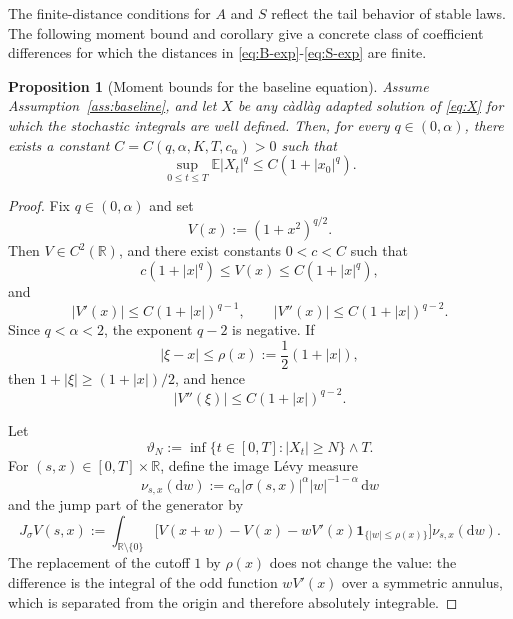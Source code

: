 \documentclass[11pt]{article}
\newtheorem{proposition}[theorem]{Proposition}
\newcommand{\R}{\mathbb{R}}
\newcommand{\E}{\mathbb{E}}
\newcommand{\1}{\mathbf{1}}
\newcommand{\md}{\mathrm{d}}
\begin{document}
The finite-distance conditions for $A$ and $S$ reflect the tail behavior of stable laws. The following moment bound and corollary give a concrete class of coefficient differences for which the distances in \eqref{eq:B-exp}-\eqref{eq:S-exp} are finite.

\begin{proposition}[Moment bounds for the baseline equation]\label{prop:baseline-moments}
Assume Assumption~\ref{ass:baseline}, and let $X$ be any c\`adl\`ag adapted solution of \eqref{eq:X} for which the stochastic integrals are well defined. Then, for every $q\in(0,\alpha)$, there exists a constant $C=C(q,\alpha,K,T,c_\alpha)>0$ such that
\[
  \sup_{0\le t\le T}\E |X_t|^q\le C(1+|x_0|^q).
\]
\end{proposition}

\begin{proof}
Fix $q\in(0,\alpha)$ and set
\[
  V(x):=(1+x^2)^{q/2}.
\]
Then $V\in C^2(\R)$, and there exist constants $0<c<C$ such that
\[
  c(1+|x|^q)\le V(x)\le C(1+|x|^q),
\]
and
\begin{equation}\label{eq:V-derivatives}
  |V'(x)|\le C(1+|x|)^{q-1},\qquad
  |V''(x)|\le C(1+|x|)^{q-2}.
\end{equation}
Since $q<\alpha<2$, the exponent $q-2$ is negative. If
\[
  |\xi-x|\le \rho(x):=\frac12(1+|x|),
\]
then $1+|\xi|\ge(1+|x|)/2$, and hence
\begin{equation}\label{eq:V-local-second}
  |V''(\xi)|\le C(1+|x|)^{q-2}.
\end{equation}

Let
\[
  \vartheta_N:=\inf\{t\in[0,T]:|X_t|\ge N\}\wedge T.
\]
For $(s,x)\in[0,T]\times\R$, define the image L\'evy measure
\[
  \nu_{s,x}(\md w):=c_\alpha|\sigma(s,x)|^\alpha |w|^{-1-\alpha}\,\md w
\]
and the jump part of the generator by
\begin{equation}\label{eq:Jsigma-definition}
J_\sigma V(s,x):=
\int_{\R\setminus\{0\}}
\bigl[V(x+w)-V(x)-wV'(x)\1_{\{|w|\le\rho(x)\}}\bigr]\nu_{s,x}(\md w).
\end{equation}
The replacement of the cutoff $1$ by $\rho(x)$ does not change the value: the difference is the integral of the odd function $wV'(x)$ over a symmetric annulus, which is separated from the origin and therefore absolutely integrable.


\end{proof}
\end{document}
